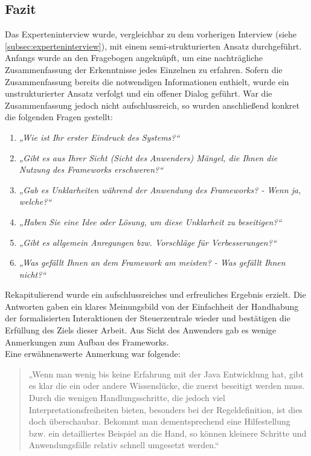     \subsection{Fazit}
        Das Experteninterview wurde, vergleichbar zu dem vorherigen Interview (siehe \ref{subsec:experteninterview}), mit einem semi-strukturierten Ansatz durchgeführt. 
        Anfangs wurde an den Fragebogen angeknüpft, um eine nachträgliche Zusammenfassung der Erkenntnisse jedes Einzelnen zu erfahren. Sofern die Zusammenfassung bereits 
        die notwendigen Informationen enthielt, wurde ein unstrukturierter Ansatz verfolgt und ein offener Dialog geführt. War die Zusammenfassung jedoch nicht 
        aufschlussreich, so wurden anschließend konkret die 
        folgenden Fragen gestellt: 
        \begin{enumerate}
            \item \textit{„Wie ist Ihr erster Eindruck des Systems?“}
            \item \textit{„Gibt es aus Ihrer Sicht (Sicht des Anwenders) Mängel, die Ihnen die Nutzung des Frameworks erschweren?“}
            \item \textit{„Gab es Unklarheiten während der Anwendung des Frameworks? - Wenn ja, welche?“}
            \item \textit{„Haben Sie eine Idee oder Lösung, um diese Unklarheit zu beseitigen?“}
            \item \textit{„Gibt es allgemein Anregungen bzw. Vorschläge für Verbesserungen?“}
            \item \textit{„Was gefällt Ihnen an dem Framework am meisten? - Was gefällt Ihnen nicht?“}
        \end{enumerate} 
        Rekapitulierend wurde ein aufschlussreiches und erfreuliches Ergebnis erzielt. Die Antworten gaben ein klares Meinungsbild von der Einfachheit der 
        Handhabung der formalisierten Interaktionen der Steuerzentrale wieder und bestätigen die Erfüllung des Ziels dieser Arbeit. 
        Aus Sicht des Anwenders gab es wenige Anmerkungen zum Aufbau des Frameworks. 
        \\
        Eine erwähnenswerte Anmerkung war folgende:
        \begin{quote}
            „Wenn man wenig bis keine Erfahrung mit der Java Entwicklung hat, gibt es klar die ein oder andere Wissenslücke, die zuerst beseitigt werden muss. 
            Durch die wenigen Handlungsschritte, die jedoch viel Interpretationsfreiheiten bieten, besonders bei der Regeldefinition, ist dies doch überschaubar. 
            Bekommt man dementsprechend eine Hilfestellung bzw. ein detailliertes Beispiel an die Hand, so können kleinere Schritte und Anwendungsfälle 
            relativ schnell umgesetzt werden.“
        \end{quote}
